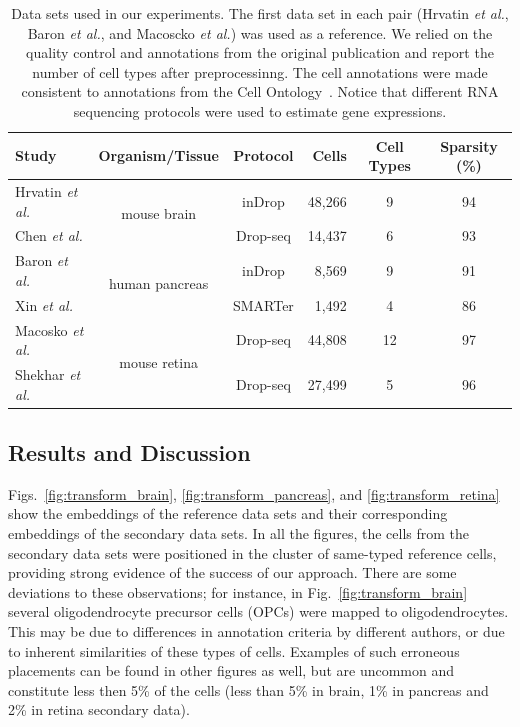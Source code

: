 \documentclass[runningheads]{llncs}
\newcommand{\etal}{\textit{et al.}}
\begin{document}
\vspace{-3mm}
\begin{table}[ht]
\begin{center}
\setlength\tabcolsep{4pt}
\begin{tabular}{l c c r c c}
\toprule
Study & Organism/Tissue & Protocol & Cells & Cell Types & Sparsity (\%) \\
\midrule
Hrvatin \etal & \multirow{2}{*}{mouse brain} & inDrop & 48,266 & 9 & 94 \\
Chen \etal & & Drop-seq & 14,437 & 6 & 93 \\[5pt]
Baron \etal & \multirow{2}{*}{human pancreas} & inDrop & 8,569 & 9 & 91 \\
Xin \etal & & SMARTer & 1,492 & 4 & 86 \\[5pt]
Macosko \etal & \multirow{2}{*}{mouse retina} & Drop-seq & 44,808 & 12 & 97 \\
Shekhar \etal & & Drop-seq & 27,499 & 5 & 96 \\
\bottomrule
\end{tabular}
\end{center}
\caption{Data sets used in our experiments. The first data set in each pair
(Hrvatin \etal, Baron \etal, and Macoscko \etal) was used as a reference.  We
relied on the quality control and annotations from the original publication
and report the number of cell types after preprocessinng.  The cell
annotations were made consistent to annotations from the Cell
Ontology~\cite{Bard2005}. Notice that different RNA sequencing protocols
were used to estimate gene expressions.}
\label{tab:data sets}
\end{table}

\subsection{Results and Discussion}
\label{sec:results}

Figs.~\ref{fig:transform_brain}, \ref{fig:transform_pancreas}, and
\ref{fig:transform_retina} show the embeddings of the reference data sets and
their corresponding embeddings of the secondary data sets. In all the figures,
the cells from the secondary data sets were positioned in the cluster of
same-typed reference cells, providing strong evidence of the success of our approach. There are some deviations to these observations; for
instance, in Fig.~\ref{fig:transform_brain} several oligodendrocyte precursor
cells (OPCs) were mapped to oligodendrocytes. This may be due to differences in
annotation criteria by different authors, or due to inherent similarities of
these types of cells. Examples of such erroneous placements can be found in
other figures as well, but are uncommon and constitute less then 5\% of
the cells (less than 5\% in brain, 1\% in pancreas and 2\% in retina
secondary data).
\end{document}
